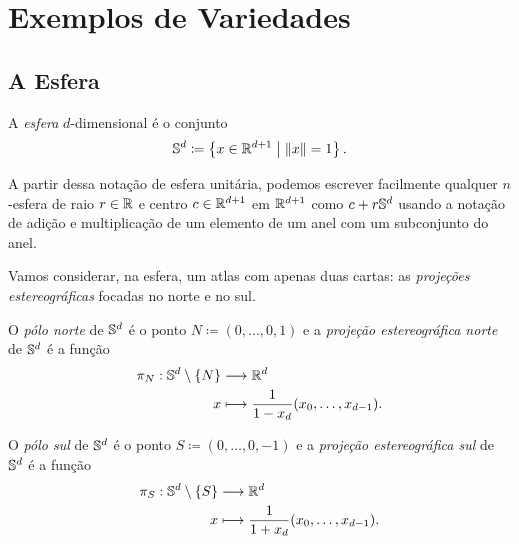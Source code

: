 \section{Exemplos de Variedades}

\subsection{A Esfera}

\begin{defi}
A \emph{esfera} $d$-dimensional é o conjunto
	\begin{equation*}
	\S^d \coloneqq \set{x \in \R^{d+1}}{\nor{x}=1}.
	\end{equation*}
\end{defi}

A partir dessa notação de esfera unitária, podemos escrever facilmente qualquer $n$-esfera de raio $r \in \R$ e centro $c \in \R^{d+1}$ em $\R^{d+1}$ como $c + r\S^d$ usando a notação de adição e multiplicação de um elemento de um anel com um subconjunto do anel.

Vamos considerar, na esfera, um atlas com apenas duas cartas: as \emph{projeções estereográficas} focadas no norte e no sul.

\begin{defi}
O \emph{pólo norte} de $\S^d$ é o ponto $N \coloneqq (0,\ldots,0,1)$ e a \emph{projeção estereográfica norte} de $\S^d$ é a função
	\begin{align*}
	\func{\pi_N}{\S^d \setminus\{N\}}{\R^d}{x}{\frac{1}{1-x_d}(x_0,\ldots,x_{d-1})}.
	\end{align*}

O \emph{pólo sul} de $\S^d$ é o ponto $S \coloneqq (0,\ldots,0,-1)$ e a \emph{projeção estereográfica sul} de $\S^d$ é a função
	\begin{align*}
	\func{\pi_S}{\S^d \setminus\{S\}}{\R^d}{x}{\frac{1}{1+x_d}(x_0,\ldots,x_{d-1})}.
	\end{align*}
\end{defi}

